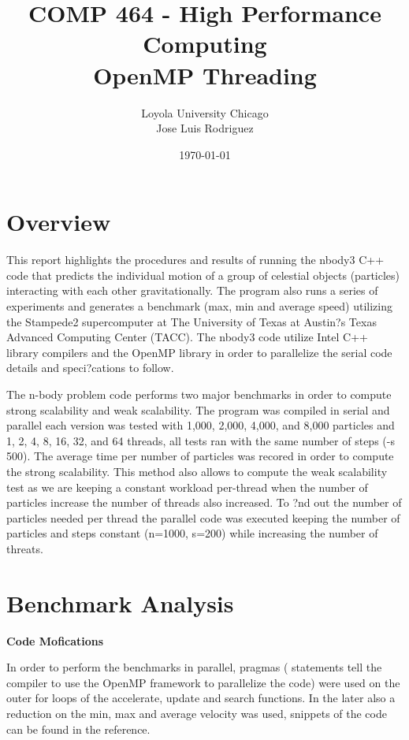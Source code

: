 \documentclass[12pt]{article} %
\title{ COMP 464 - High Performance Computing \\ OpenMP Threading} %
\author{
Loyola University Chicago \\
Jose Luis Rodriguez 
} %
\date{\today} %
\begin{document}
\maketitle

\thispagestyle{fancy}


\section{Overview}

This report highlights the procedures and results of running the nbody3 C++ code that predicts the individual motion of a group of celestial objects (particles) interacting with each other gravitationally. The program also runs a series of experiments and generates a benchmark (max, min and average speed) utilizing the Stampede2 supercomputer at The University of Texas at Austin?s Texas Advanced Computing Center (TACC). The nbody3 code utilize Intel C++ library compilers and the OpenMP library in order to parallelize the serial code details and speci?cations to follow.

The n-body problem code performs two major benchmarks in order to compute strong scalability and weak scalability. The program was compiled in serial and parallel each version was tested with 1,000, 2,000, 4,000, and 8,000 particles and 1, 2, 4, 8, 16, 32, and 64 threads, all tests ran with the same number of steps (-s 500). The average time per number of particles was recored in order to compute the strong scalability. This method also allows to compute the weak scalability test as we are keeping a constant workload per-thread when the number of particles increase the number of threads also increased. To ?nd out the number of particles needed per thread the parallel code was executed keeping the number of particles and steps constant (n=1000, s=200) while increasing the number of threats.

\section{Benchmark Analysis}

\textbf{Code Mofications} 

In order to perform the benchmarks in parallel, pragmas ( statements tell the compiler to use the OpenMP framework to parallelize the code) were used on the outer for loops of the accelerate, update and search functions. In the later also a reduction on the min, max and average velocity was used, snippets of the code can be found in the reference.
\end{document}
